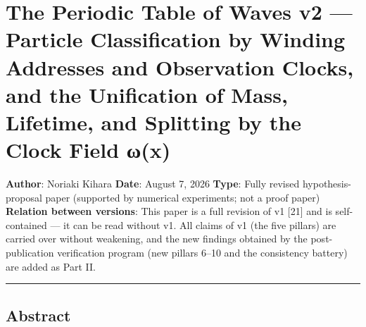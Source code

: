 \documentclass[
]{article}
\author{}
\date{}
\begin{document}
\section{The Periodic Table of Waves v2 --- Particle Classification by
Winding Addresses and Observation Clocks, and the Unification of Mass,
Lifetime, and Splitting by the Clock Field
ω(x)}\label{the-periodic-table-of-waves-v2-particle-classification-by-winding-addresses-and-observation-clocks-and-the-unification-of-mass-lifetime-and-splitting-by-the-clock-field-ux3c9x}

\textbf{Author}: Noriaki Kihara \textbf{Date}: August 7, 2026
\textbf{Type}: Fully revised hypothesis-proposal paper (supported by
numerical experiments; not a proof paper) \textbf{Relation between
versions}: This paper is a full revision of v1 {[}21{]} and is
self-contained --- it can be read without v1. All claims of v1 (the five
pillars) are carried over without weakening, and the new findings
obtained by the post-publication verification program (new pillars 6--10
and the consistency battery) are added as Part II.

\begin{center}\rule{0.5\linewidth}{0.5pt}\end{center}

\subsection{Abstract}\label{abstract}
\end{document}
